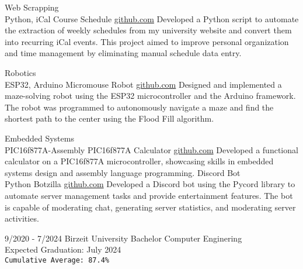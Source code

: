 \documentclass[9pt]{developercv} %
\begin{document}
\begin{entrylist}
    \entry
		{Web Scrapping \\ Python, iCal}
		{Course Schedule}
		{\href{https://github.com/mabushelbaia/Course-Schedule}{github.com}}
		{Developed a Python script to automate the extraction of weekly schedules from my university website and convert them into recurring iCal events. This project aimed to improve personal organization and time management by eliminating manual schedule data entry.}

    \entry
        {Robotics\\ ESP32, Arduino}
        {Micromouse Robot}
        {\href{https://github.com/mabushelbaia/Micromouse}{github.com}}
        {Designed and implemented a maze-solving robot using the ESP32 microcontroller and the Arduino framework. The robot was programmed to autonomously navigate a maze and find the shortest path to the center using the Flood Fill algorithm.}
        
	\entry
		{Embedded Systems\\ PIC16f877A-Assembly}
		{PIC16f877A Calculator}
		{\href{https://github.com/mabushelbaia/PIC16F877A-Calculator}{github.com}}
		{Developed a functional calculator on a PIC16f877A microcontroller, showcasing skills in embedded systems design and assembly language programming.}
    \entry
        {Discord Bot\\ Python}
        {Botzilla}
        {\href{https://github.com/mabushelbaia/Botzilla}{github.com}}
        {Developed a Discord bot using the Pycord library to automate server management tasks and provide entertainment features. The bot is capable of moderating chat, generating server statistics, and moderating server activities.}

\end{entrylist}

\vspace{-10 pt}
\begin{entrylist}
    \entry
		{9/2020 - 7/2024}
		{Birzeit University}
		{Bachelor}
		{Computer Enginering\\
        Expected Graduation: July 2024\\
        \texttt{Cumulative Average: 87.4\%}
        }

\end{entrylist}
\end{document}
